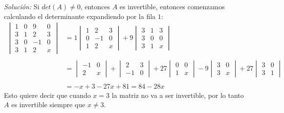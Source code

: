 \documentclass{article}
\newenvironment{solution}
    {\textit{Solución:}}
    {}
\begin{document}
\begin{solution}
    Si $det(A)\neq 0$, entonces $A$ es invertible, entonces comenzamos calculando el determinante expandiendo por la fila $1$:
\[
\begin{aligned}
\begin{vmatrix}
1 & 0 & 9 & 0 \\
3 & 1 & 2 & 3 \\
3 & 0 & -1 & 0 \\
3 & 1 & 2 & x
\end{vmatrix} &= 1 
\begin{vmatrix}
1 & 2 & 3 \\
0 & -1 & 0 \\
1 & 2 & x
\end{vmatrix} + 9
\begin{vmatrix}
3 & 1 & 3 \\
3 & 0 & 0 \\
3 & 1 & x
\end{vmatrix} \\ \\
&= 
\begin{vmatrix}
-1 & 0 \\
2 & x
\end{vmatrix} + 
\begin{vmatrix}
2 & 3 \\
-1 & 0
\end{vmatrix} + 27
\begin{vmatrix}
0 & 0 \\
1 & x
\end{vmatrix} -9
\begin{vmatrix}
3 & 0 \\
3 & x
\end{vmatrix} + 27
\begin{vmatrix}
3 & 0 \\
3 & 1
\end{vmatrix} \\ \\
&= -x + 3 -27x + 81 = 84-28x
\end{aligned}  
\]
Esto quiere decir que cuando $x=3$ la matriz no va a ser invertible, por lo tanto $A$ es invertible siempre que $x\neq 3$.
\end{solution}
\end{document}
